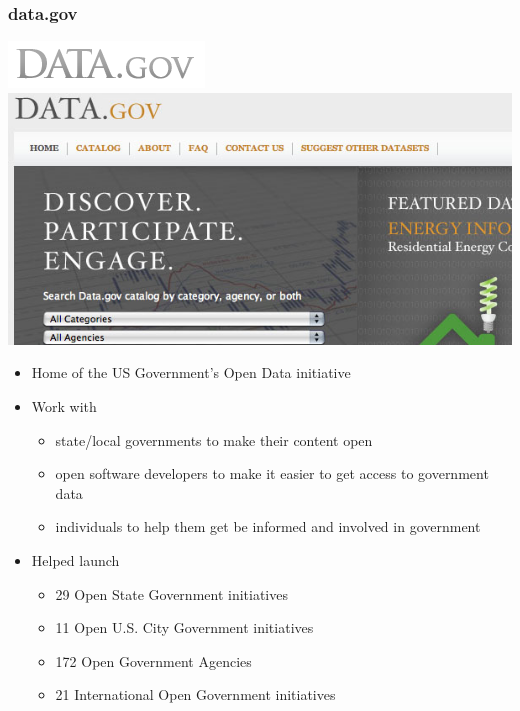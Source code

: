 \documentclass{beamer}
\begin{document}
\begin{frame}
  \frametitle{data.gov}
  \begin{center} \includegraphics[height=0.1\textheight]{img/data-gov} \hspace{2em} \includegraphics[height=0.2\textheight]{img/data-gov-site} \end{center}
  
  \begin{itemize}
  \item Home of the US Government's Open Data initiative
  \item Work with
    \begin{itemize}
    \item state/local governments to make their content open
    \item open software developers to make it easier to get access to government data
    \item individuals to help them get be informed and involved in government
    \end{itemize}
  \item Helped launch
    \begin{itemize}
    \item 29 Open State Government initiatives
    \item 11 Open U.S. City Government initiatives
    \item 172 Open Government Agencies
    \item 21 International Open Government initiatives
    \end{itemize}

  \end{itemize}
\end{frame}
\end{document}
